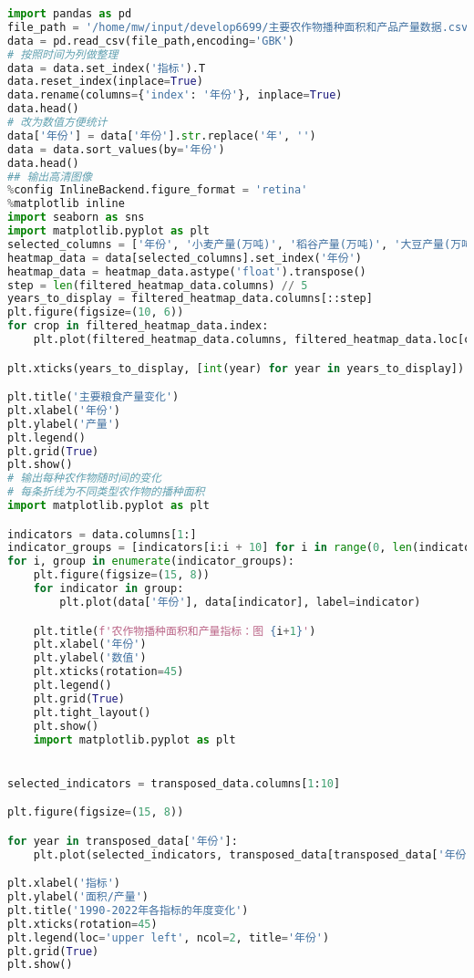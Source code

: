 \begin{lstlisting}[language=python,caption={主要农作物播种面积和产品产量数据
}]
import pandas as pd
file_path = '/home/mw/input/develop6699/主要农作物播种面积和产品产量数据.csv'
data = pd.read_csv(file_path,encoding='GBK')
# 按照时间为列做整理
data = data.set_index('指标').T
data.reset_index(inplace=True)
data.rename(columns={'index': '年份'}, inplace=True)
data.head()
# 改为数值方便统计
data['年份'] = data['年份'].str.replace('年', '')
data = data.sort_values(by='年份')
data.head()
## 输出高清图像
%config InlineBackend.figure_format = 'retina'
%matplotlib inline
import seaborn as sns
import matplotlib.pyplot as plt
selected_columns = ['年份', '小麦产量(万吨)', '稻谷产量(万吨)', '大豆产量(万吨)', '玉米产量(万吨)']
heatmap_data = data[selected_columns].set_index('年份')
heatmap_data = heatmap_data.astype('float').transpose()
step = len(filtered_heatmap_data.columns) // 5  
years_to_display = filtered_heatmap_data.columns[::step]
plt.figure(figsize=(10, 6))
for crop in filtered_heatmap_data.index:
    plt.plot(filtered_heatmap_data.columns, filtered_heatmap_data.loc[crop], marker='o', label=crop)

plt.xticks(years_to_display, [int(year) for year in years_to_display])

plt.title('主要粮食产量变化')
plt.xlabel('年份')
plt.ylabel('产量')
plt.legend()
plt.grid(True)
plt.show()
# 输出每种农作物随时间的变化
# 每条折线为不同类型农作物的播种面积
import matplotlib.pyplot as plt

indicators = data.columns[1:] 
indicator_groups = [indicators[i:i + 10] for i in range(0, len(indicators), 10)]
for i, group in enumerate(indicator_groups):
    plt.figure(figsize=(15, 8))
    for indicator in group:
        plt.plot(data['年份'], data[indicator], label=indicator)

    plt.title(f'农作物播种面积和产量指标：图 {i+1}')
    plt.xlabel('年份')
    plt.ylabel('数值')
    plt.xticks(rotation=45)
    plt.legend()
    plt.grid(True)
    plt.tight_layout()
    plt.show()
    import matplotlib.pyplot as plt


selected_indicators = transposed_data.columns[1:10] 

plt.figure(figsize=(15, 8))

for year in transposed_data['年份']:
    plt.plot(selected_indicators, transposed_data[transposed_data['年份'] == year].iloc[0, 1:10], label=year)

plt.xlabel('指标')
plt.ylabel('面积/产量')
plt.title('1990-2022年各指标的年度变化')
plt.xticks(rotation=45)
plt.legend(loc='upper left', ncol=2, title='年份')
plt.grid(True)
plt.show()


\end{lstlisting}
